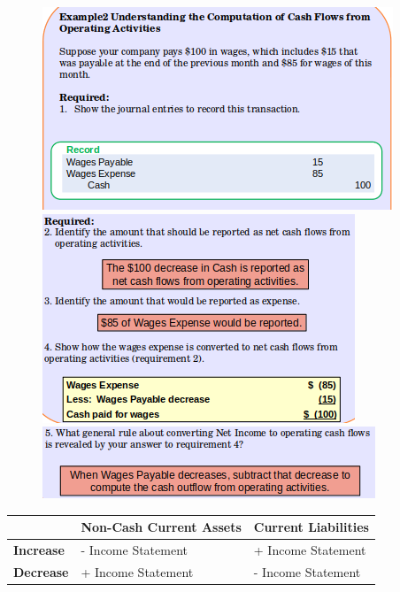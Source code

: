 \documentclass[../main.tex]{subfiles}
\begin{document}
	\begin{figure}[ht]
		\centering
		\includegraphics[width=0.9\columnwidth]{images/c11/cash_flows_eg2_p1.png}
		\includegraphics[width=0.85\columnwidth]{images/c11/cash_flows_eg2_p2.png}
		\includegraphics[width=0.85\columnwidth]{images/c11/cash_flows_eg2_p3.png}
	\end{figure}
	\begin{tabular}{|p{}|p{}|p{}|}
		\hline
		& \textbf{Non-Cash Current Assets} & \textbf{Current Liabilities} \\
		\hline
		\textbf{Increase} & - Income Statement & + Income Statement \\ 
		\hline
		\textbf{Decrease} & + Income Statement & - Income Statement \\
		\hline
	\end{tabular}
\end{document}
